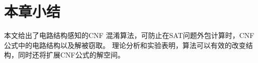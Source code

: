 \section{本章小结}
本文给出了电路结构感知的CNF 混淆算法，可防止在SAT问题外包计算时，CNF公式中的电路结构以及解被窃取。
理论分析和实验表明，算法可以有效的改变结构，同时还将扩展CNF公式的解空间。

